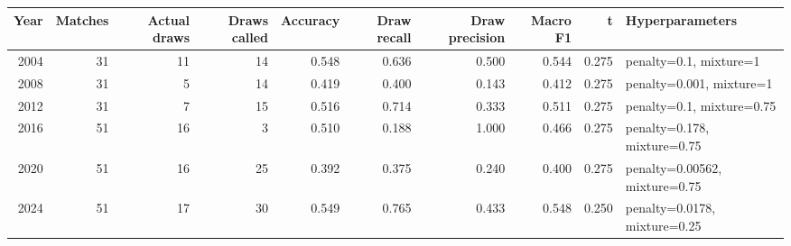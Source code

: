 
\begin{tabular}{rrrrrrrrrl}
\toprule
Year & Matches & Actual draws & Draws called & Accuracy & Draw recall & Draw precision & Macro F1 & t & Hyperparameters\\
\midrule
2004 & 31 & 11 & 14 & 0.548 & 0.636 & 0.500 & 0.544 & 0.275 & penalty=0.1, mixture=1\\
2008 & 31 & 5 & 14 & 0.419 & 0.400 & 0.143 & 0.412 & 0.275 & penalty=0.001, mixture=1\\
2012 & 31 & 7 & 15 & 0.516 & 0.714 & 0.333 & 0.511 & 0.275 & penalty=0.1, mixture=0.75\\
2016 & 51 & 16 & 3 & 0.510 & 0.188 & 1.000 & 0.466 & 0.275 & penalty=0.178, mixture=0.75\\
2020 & 51 & 16 & 25 & 0.392 & 0.375 & 0.240 & 0.400 & 0.275 & penalty=0.00562, mixture=0.75\\
2024 & 51 & 17 & 30 & 0.549 & 0.765 & 0.433 & 0.548 & 0.250 & penalty=0.0178, mixture=0.25\\
\bottomrule
\end{tabular}
